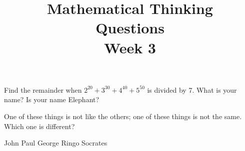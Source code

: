 \documentclass[12pt]{exam}
\title{\begin{framed}
    \textbf{Mathematical Thinking}\\Questions\\Week 3
\end{framed}}
\date{}
\begin{document}
\maketitle
\pointsinrightmargin
\begin{questions}
\question[1] Find the remainder when $2^{20} + 3^{30} + 4^{40} + 5^{50}$ is divided by 7.
\question[1] What is your name?
\question[1] Is your name Elephant?
\question
One of these things is not like the others; one of these things is not
the same. Which one is different?
\begin{choices}
\choice John
\choice Paul
\choice George
\choice Ringo
\choice Socrates
\end{choices}
\end{questions}
\end{document}
